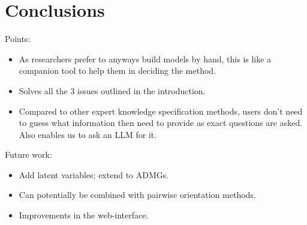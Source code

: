 \documentclass{uai2025} %
\begin{document}
\section{Conclusions}

Points:
\begin{itemize}
	\item As researchers prefer to anyways build models by hand, this is like a companion tool to help them in deciding the method.
	\item Solves all the $ 3 $ issues outlined in the introduction.
	\item Compared to other expert knowledge specification methods, users don't need to guess what information then need to provide as exact questions are asked. Also enables us to ask an LLM for it.
\end{itemize}

Future work:
\begin{itemize}
	\item Add latent variables; extend to ADMGs.
	\item Can potentially be combined with pairwise orientation methods.
	\item Improvements in the web-interface.
\end{itemize}



\newpage


\end{document}
